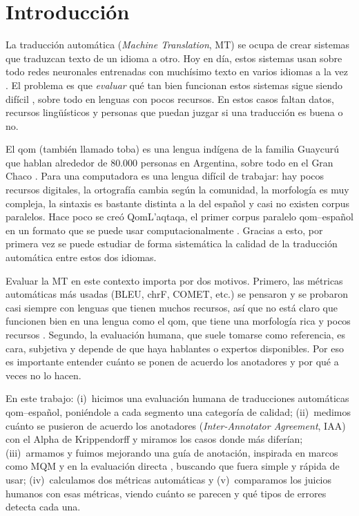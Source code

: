 \section{Introducción}
\label{sec:introduccion}

La traducción automática (\emph{Machine Translation}, MT) se ocupa de crear
sistemas que traduzcan texto de un idioma a otro. Hoy en día, estos sistemas
usan sobre todo redes neuronales entrenadas con muchísimo texto en varios idiomas a
la vez \citep{jurafsky2026mt}. El problema es que \emph{evaluar} qué tan bien
funcionan estos sistemas sigue siendo difícil \citep{ebrahimi2023findings}, sobre
todo en lenguas con pocos recursos. En estos casos faltan datos, recursos
lingüísticos y personas que puedan juzgar si una traducción es buena o no.

El qom (también llamado toba) es una lengua indígena de la familia Guaycurú que
hablan alrededor de 80.000 personas en Argentina, sobre todo en el Gran Chaco
\citep{ticona2025indigenous}. Para una computadora es una lengua difícil de
trabajar: hay pocos recursos digitales, la ortografía cambia según la comunidad,
la morfología es muy compleja, la sintaxis es bastante distinta a la del español y
casi no existen corpus paralelos. Hace poco se creó QomL'aqtaqa, el primer corpus
paralelo qom--español en un formato que se puede usar computacionalmente
\citep{cotik2026qomlaqtaqa}. Gracias a esto, por primera vez se puede estudiar de
forma sistemática la calidad de la traducción automática entre estos dos idiomas.

Evaluar la MT en este contexto importa por dos motivos. Primero, las métricas
automáticas más usadas (BLEU, chrF, COMET, etc.)
\citep{papineni2002bleu,popovic2015chrf,rei2020comet} se pensaron y se probaron
casi siempre con lenguas que tienen muchos recursos, así que no está claro que
funcionen bien en una lengua como el qom, que tiene una morfología rica y pocos
recursos \citep{degibert2025findings}. Segundo, la evaluación humana, que suele
tomarse como referencia, es cara, subjetiva y depende de que haya hablantes o
expertos disponibles. Por eso es importante entender cuánto se ponen de acuerdo
los anotadores y por qué a veces no lo hacen.

En este trabajo: (i)~hicimos una evaluación humana de traducciones automáticas
qom--español, poniéndole a cada segmento una categoría de calidad; (ii)~medimos
cuánto se pusieron de acuerdo los anotadores (\emph{Inter-Annotator Agreement},
IAA) con el Alpha de Krippendorff y miramos los casos donde más diferían;
(iii)~armamos y fuimos mejorando una guía de anotación, inspirada en marcos como
MQM \citep{lommel2014mqm} y en la evaluación directa \citep{graham2013da},
buscando que fuera simple y rápida de usar; (iv)~calculamos dos métricas
automáticas y (v)~comparamos los juicios humanos con esas métricas, viendo cuánto
se parecen y qué tipos de errores detecta cada una.

